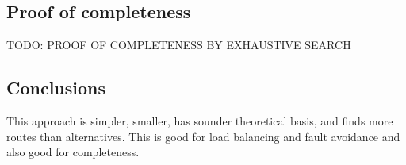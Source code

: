 		\subsection{Proof of completeness}
		
			TODO: PROOF OF COMPLETENESS BY EXHAUSTIVE SEARCH
	
		\subsection{Conclusions}
			
			This approach is simpler, smaller, has sounder theoretical basis, and
			finds more routes than alternatives. This is good for load balancing and
			fault avoidance and also good for completeness.

